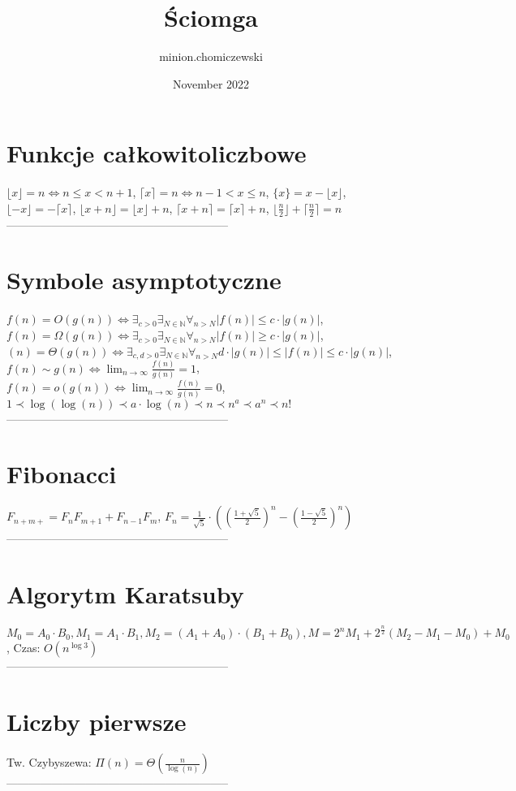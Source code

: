 \documentclass{article}
\title{Ściomga}
\author{minion.chomiczewski }
\date{November 2022}
\begin{document}
\setlength{\abovedisplayskip}{0.0pt}
\setlength{\belowdisplayskip}{0.0pt}
\setlength{\tabcolsep}{0.0pt}
\begin{minipage}[t]{.325\textwidth}
\section*{Funkcje całkowitoliczbowe}
$\lfloor x \rfloor = n \iff n\leq x < n+1$, $\lceil x \rceil = n \iff n-1 < x \leq n$, $\{x\} = x - \lfloor x \rfloor$, $\lfloor -x \rfloor = -\lceil x \rceil$, $\lfloor x + n \rfloor = \lfloor x \rfloor +n$, $\lceil x + n \rceil = \lceil x \rceil + n$, $\lfloor \frac{n}{2} \rfloor + \lceil \frac{n}{2} \rceil = n$\\
-----------------------------------------------------------
\section*{Symbole asymptotyczne}
$f(n) = O(g(n)) \iff \exists_{c>0}\exists_{N \in \mathbb{N}}\forall_{n > N}|f(n)|\leq c\cdot |g(n)|$, $f(n) = \Omega(g(n)) \iff \exists_{c>0}\exists_{N \in \mathbb{N}}\forall_{n > N} |f(n)| \geq c\cdot |g(n)|$, $(n) = \Theta(g(n))\iff \exists_{c,d>0}\exists_{N \in \mathbb{N}}\forall_{n > N} d\cdot |g(n)| \leq |f(n)| \leq c \cdot |g(n)|$, $f(n) \sim g(n) \iff \lim_{n\rightarrow\infty}\frac{f(n)}{g(n)} = 1$, $f(n) = o(g(n)) \iff \lim_{n\rightarrow\infty}\frac{f(n)}{g(n)} = 0$, $1 \prec \log(\log(n)) \prec a\cdot\log(n)\prec n \prec n^a \prec a^n \prec n!$\\
-----------------------------------------------------------
\section*{Fibonacci}
$F_{n+m+} = F_{n}F_{m+1} + F_{n-1}F_{m}$, $F_n = \frac{1}{\sqrt{5}}\cdot\left(\left(\frac{1+\sqrt{5}}{2}\right)^n - \left(\frac{1-\sqrt{5}}{2}\right)^n\right)$\\
-----------------------------------------------------------
\section*{Algorytm Karatsuby}
$M_0 = A_0\cdot B_0, M_1 = A_1 \cdot B_1, M_2 = (A_1 + A_0)\cdot(B_1 + B_0), M = 2^nM_1 + 2^{\frac{n}{2}}(M_2 - M_1 - M_0) + M_0$, Czas: $O(n^{\log3})$\\
-----------------------------------------------------------
\section*{Liczby pierwsze}
Tw. Czybyszewa: $\Pi(n) = \Theta(\frac{n}{\log(n)})$\\
-----------------------------------------------------------

\end{minipage}
\end{document}
